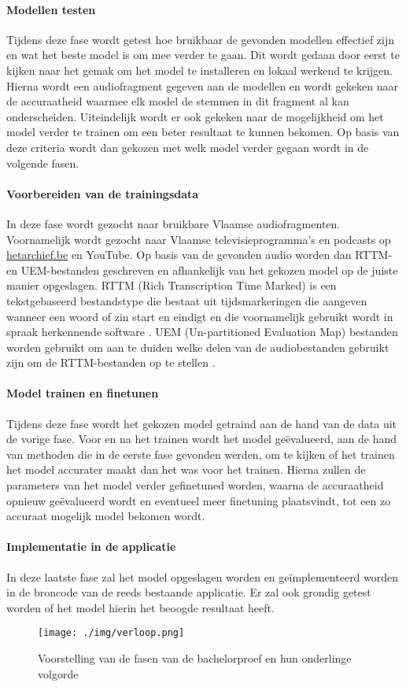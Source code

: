 \paragraph{Modellen testen}
Tijdens deze fase wordt getest hoe bruikbaar de gevonden modellen effectief zijn en wat het beste model is om mee verder te gaan. Dit wordt gedaan door eerst te kijken naar het gemak om het model te installeren en lokaal werkend te krijgen. Hierna wordt een audiofragment gegeven aan de modellen en wordt gekeken naar de accuraatheid waarmee elk model de stemmen in dit fragment al kan onderscheiden. Uiteindelijk wordt er ook gekeken naar de mogelijkheid om het model verder te trainen om een beter resultaat te kunnen bekomen. Op basis van deze criteria wordt dan gekozen met welk model verder gegaan wordt in de volgende fasen.

\paragraph{Voorbereiden van de trainingsdata}
In deze fase wordt gezocht naar bruikbare Vlaamse audiofragmenten. Voornamelijk wordt gezocht naar Vlaamse televisieprogramma's en podcasts op \url{hetarchief.be} en YouTube. Op basis van de gevonden audio worden dan RTTM- en UEM-bestanden geschreven en afhankelijk van het gekozen model op de juiste manier opgeslagen. RTTM (Rich Transcription Time Marked) is een tekstgebaseerd bestandstype die bestaat uit tijdsmarkeringen die aangeven wanneer een woord of zin start en eindigt en die voornamelijk gebruikt wordt in spraak herkennende software \autocite{filext}. UEM (Un-partitioned Evaluation Map) bestanden worden gebruikt om aan te duiden welke delen van de audiobestanden gebruikt zijn om de RTTM-bestanden op te stellen \autocite{Ryant}.

\paragraph{Model trainen en finetunen}
Tijdens deze fase wordt het gekozen model getraind aan de hand van de data uit de vorige fase. Voor en na het trainen wordt het model geëvalueerd, aan de hand van methoden die in de eerste fase gevonden werden, om te kijken of het trainen het model accurater maakt dan het was voor het trainen. Hierna zullen de parameters van het model verder gefinetuned worden, waarna de accuraatheid opnieuw geëvalueerd wordt en eventueel meer finetuning plaatsvindt, tot een zo accuraat mogelijk model bekomen wordt.

\paragraph{Implementatie in de applicatie}
In deze laatste fase zal het model opgeslagen worden en geïmplementeerd worden in de broncode van de reeds bestaande applicatie. Er zal ook grondig getest worden of het model hierin het beoogde resultaat heeft.

\begin{figure}
	\centering
	\texttt{[image: ./img/verloop.png]}
	\caption{\label{fig:flow-chart}Voorstelling van de fasen van de bachelorproef en hun onderlinge volgorde}
\end{figure}